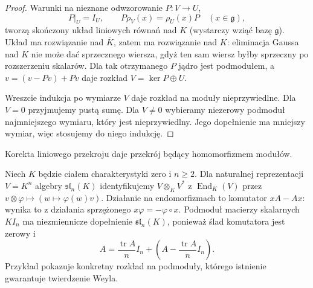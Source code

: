 \begin{proof}
Warunki na nieznane odwzorowanie $P:V\to U$,
\[
 P|_U=I_U,\qquad P\rho_V(x)=\rho_U(x)P\quad(x\in\mathfrak g),
\]
tworzą skończony układ liniowych równań nad $K$ (wystarczy wziąć bazę $\mathfrak g$). Układ ma rozwiązanie nad $\overline K$, zatem ma rozwiązanie nad $K$: eliminacja Gaussa nad $K$ nie może dać sprzecznego wiersza, gdyż ten sam wiersz byłby sprzeczny po rozszerzeniu skalarów. Dla tak otrzymanego $P$ jądro jest podmodułem, a $v=(v-Pv)+Pv$ daje rozkład $V=\ker P\oplus U$.

Wreszcie indukcja po wymiarze $V$ daje rozkład na moduły nieprzywiedlne. Dla $V=0$ przyjmujemy pustą sumę. Dla $V\ne0$ wybieramy niezerowy podmoduł najmniejszego wymiaru, który jest nieprzywiedlny. Jego dopełnienie ma mniejszy wymiar, więc stosujemy do niego indukcję.
\end{proof}

\begin{center}

\small Korekta liniowego przekroju daje przekrój będący homomorfizmem modułów.
\end{center}

\begin{przyklad}
\label{aa:prz:weyl-endomorphisms}
Niech $K$ będzie ciałem charakterystyki zero i $n\ge2$. Dla naturalnej reprezentacji $V=K^n$ algebry $\mathfrak{sl}_n(K)$ identyfikujemy $V\otimes_K V^*$ z $\operatorname{End}_K(V)$ przez $v\otimes\varphi\mapsto(w\mapsto\varphi(w)v)$. Działanie na endomorfizmach to komutator $xA-Ax$: wynika to z działania sprzężonego $x\varphi=-\varphi\circ x$. Podmoduł macierzy skalarnych $KI_n$ ma niezmiennicze dopełnienie $\mathfrak{sl}_n(K)$, ponieważ ślad komutatora jest zerowy i
\[
 A=\frac{\operatorname{tr}A}{n}I_n+
       \left(A-\frac{\operatorname{tr}A}{n}I_n\right).
\]
Przykład pokazuje konkretny rozkład na podmoduły, którego istnienie gwarantuje twierdzenie Weyla.
\end{przyklad}

